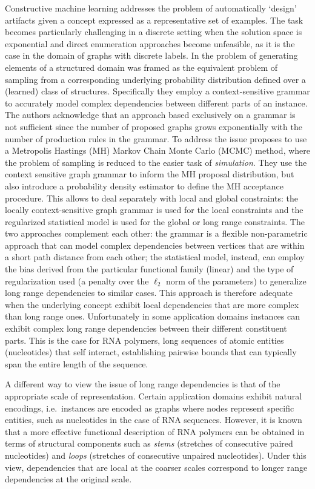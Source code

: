 \documentclass[a4paper]{esannV2}
\begin{document}
Constructive machine learning addresses the problem of automatically `design'
artifacts given a concept expressed as a representative set of examples. The
task becomes particularly challenging in a discrete setting when the solution
space is exponential and direct enumeration approaches become unfeasible, as
it is the case in the domain of graphs with discrete labels. In \cite{costa16}
the problem of generating elements of a structured domain was framed as the
equivalent problem of sampling from a corresponding underlying probability
distribution defined over a (learned) class of structures. 
Specifically they
employ a context-sensitive grammar to accurately model complex dependencies
between different parts of an instance. The authors acknowledge that an
approach based exclusively on a grammar is not sufficient since the number of
proposed graphs grows exponentially with the number of production rules in the
grammar. To address the issue \cite{costa16} proposes to use a Metropolis
Hastings (MH) Markov Chain Monte Carlo (MCMC) method, where the problem of
sampling is reduced to the easier task of {\em simulation}. They use the
context sensitive graph grammar to inform the MH proposal distribution, but
also introduce a probability density estimator to define the MH acceptance
procedure. This allows to deal separately with local and global constraints:
the locally context-sensitive graph grammar is used for the local constraints
and the regularized statistical model is used for the global or long range
constraints. The two approaches complement each other: the grammar is a
flexible non-parametric approach that can model complex dependencies between
vertices that are within a short path distance from each other; the
statistical model, instead, can employ the bias derived from the particular
functional family (linear) and the type of regularization used (a penalty over
the $\ell_2$ norm of the parameters) to generalize long range dependencies to
similar cases. This approach is therefore adequate when the underlying concept
exhibit local dependencies that are more complex than long range ones.
Unfortunately in some application domains instances can exhibit complex long
range dependencies between their different constituent parts. This is the case
for RNA polymers, long sequences of atomic entities (nucleotides) that self
interact, establishing pairwise bounds that can typically span the entire
length of the sequence.

A different way to view the issue of long range dependencies is that of the
appropriate scale of representation. Certain application domains exhibit
natural encodings, i.e.\ instances are encoded as graphs where nodes represent
specific entities, such as nucleotides in the case of RNA sequences. However,
it is known that a more effective functional description of RNA polymers can
be obtained in terms of structural components such as {\em stems} \/(stretches
of consecutive paired nucleotides) and {\em loops} \/(stretches of consecutive
unpaired nucleotides). Under this view, dependencies that are local at the
coarser scales correspond to longer range dependencies at the original scale.
\end{document}

